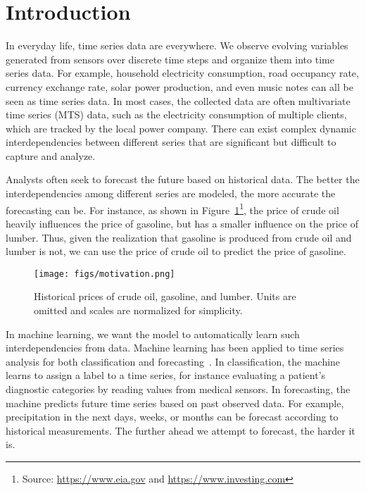 \section{Introduction}\label{sec:introduction}

In everyday life, time series data are everywhere.
We observe evolving variables generated from sensors over discrete time steps and organize them into time series data. 
For example, household electricity consumption, road occupancy rate, currency exchange rate, solar power production, and even music notes can all be seen as time series data.
In most cases, the collected data are often multivariate time series (MTS) data, such as the electricity consumption of multiple clients, which are tracked by the local power company.
There can exist complex dynamic interdependencies between different series that are significant but difficult to capture and analyze.

Analysts   often seek to forecast the future based on historical data.
The better the interdependencies among different series are modeled, the more accurate the forecasting can be.
For instance, as shown in Figure~\ref{fig:motivation}\footnote{\scriptsize Source: \url{https://www.eia.gov} and \url{https://www.investing.com}}, the price of crude oil heavily influences the price of gasoline, but has a smaller influence on the price of lumber.
Thus, given the realization that gasoline is produced from crude oil and lumber is not, we can use the price of crude oil to predict the price of gasoline.

\begin{figure}[t]
 \centering
 \texttt{[image: figs/motivation.png]}
 \caption{Historical prices of crude oil, gasoline, and lumber. Units are omitted and scales are normalized for simplicity.}\label{fig:motivation}
\end{figure} 

In machine learning, we want the model to automatically learn such interdependencies from data.
Machine learning has been applied to time series analysis for both classification and forecasting~\cite{forecasting-ANN,forecasting-hybrid-NN,LSTNet,DA-RNN}.
In classification, the machine learns to assign a label to a time series, for instance
evaluating a patient's diagnostic categories by reading values from medical sensors.
In forecasting, the machine predicts future time series based on past observed data.
For example, precipitation in the next days, weeks, or months can be forecast according to historical measurements.
The further ahead we attempt to forecast, the harder it is.

